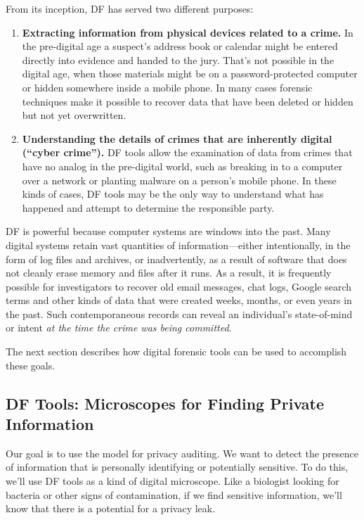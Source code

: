 From its inception, DF has served two different purposes:

\begin{enumerate}
\item \textbf{Extracting information from physical devices related to
  a crime.} In the pre-digital age a suspect's address book or
calendar might be entered directly into evidence and handed to the
jury. That's not possible in the digital age, when those materials
might be on a password-protected computer or hidden somewhere inside a
mobile phone. In many cases forensic techniques make it possible to
recover data that have been deleted or hidden but not yet
overwritten. 

\item \textbf{Understanding the details of crimes that are inherently
  digital (``cyber crime'').} DF tools allow the examination of
data from crimes that have no analog in the pre-digital world, such as
breaking in to a computer over a network or planting malware on a
person's mobile phone. In these kinds of cases, DF tools may be the
only way to understand what has happened and attempt to determine the
responsible party. 

\end{enumerate}

DF is powerful because computer systems are windows into the
past. Many digital systems retain vast quantities of
information---either intentionally, in the form of log files and
archives, or inadvertently, as a result of software that does not
cleanly erase memory and files after it runs. As a result, it
is frequently possible for investigators to recover old email
messages, chat logs, Google search terms and other kinds of data
that were created
weeks, months, or even years in the past. Such contemporaneous records
can reveal an individual's state-of-mind or intent \emph{at the time
  the crime was being committed}.

The next section describes how digital forensic tools can be used to
accomplish these goals.

\subsection{DF Tools: Microscopes for Finding Private Information \DONE}

Our goal is to use
the model for privacy auditing. We want to detect the presence of
information that is personally identifying or potentially
sensitive. To do this, we'll use DF tools as a kind of digital
microscope. Like a biologist looking for bacteria or other signs of
contamination, if we find sensitive information, we'll know that there is a potential
for a privacy leak.

